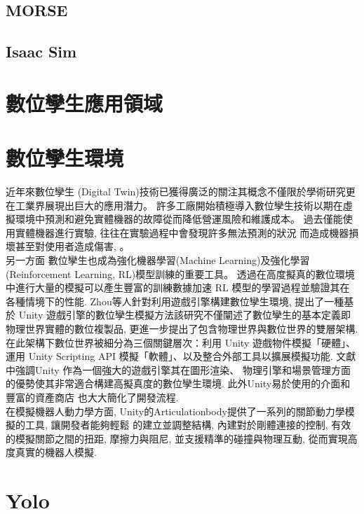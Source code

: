 \subsection{MORSE}
\subsection{Isaac Sim}
\section{數位孿生應用領域}
\section{數位孿生環境}
近年來數位孿生 (Digital Twin)技術已獲得廣泛的關注其概念不僅限於學術研究更在工業界展現出巨大的應用潛力。
許多工廠開始積極導入數位孿生技術以期在虛擬環境中預測和避免實體機器的故障從而降低營運風險和維護成本。
過去僅能使用實體機器進行實驗, 往往在實驗過程中會發現許多無法預測的狀況
而造成機器損壞甚至對使用者造成傷害, 。\\
另一方面
數位孿生也成為強化機器學習(Machine Learning)及強化學習(Reinforcement Learning, RL)模型訓練的重要工具。
透過在高度擬真的數位環境中進行大量的模擬可以產生豐富的訓練數據加速 RL 模型的學習過程並驗證其在各種情境下的性能.
Zhou等人\cite{DigitalTwin}針對利用遊戲引擎構建數位孿生環境,
提出了一種基於 Unity 遊戲引擎的數位孿生模擬方法該研究不僅闡述了數位孿生的基本定義即物理世界實體的數位複製品,
更進一步提出了包含物理世界與數位世界的雙層架構. 在此架構下數位世界被細分為三個關鍵層次：利用 Unity 遊戲物件模擬「硬體」、
運用 Unity Scripting API 模擬「軟體」、以及整合外部工具以擴展模擬功能. 文獻中強調Unity 作為一個強大的遊戲引擎其在圖形渲染、
物理引擎和場景管理方面的優勢使其非常適合構建高擬真度的數位孿生環境. 此外Unity易於使用的介面和豐富的資產商店 也大大簡化了開發流程. \\
在模擬機器人動力學方面, Unity的Articulationbody\cite{UnityArticulation2024}提供了一系列的關節動力學模擬的工具, 讓開發者能夠輕鬆
的建立並調整結構, 內建對於剛體連接的控制, 有效的模擬關節之間的扭距, 摩擦力與阻尼, 並支援精準的碰撞與物理互動, 從而實現高度真實的機器人模擬.
\section{Yolo}

